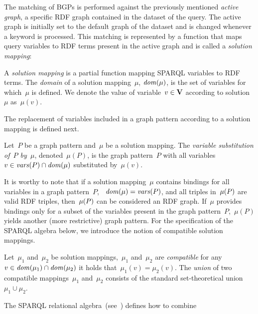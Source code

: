 The matching of \acp{BGP} is performed against the previously mentioned \emph{active graph}, a specific \ac{RDF} graph
contained in the dataset of the query.  The active graph is initially set to the default graph of the dataset and is
changed whenever a \GRAPH keyword is processed.
%
This matching is represented by a function that maps query variables to \ac{RDF} terms present in the active graph and is
called a \emph{solution mapping}:
%
\begin{definition}
  \label{def:solution-mapping}
  A \emph{solution mapping} is a partial function mapping SPARQL variables to \ac{RDF} terms.  The \emph{domain} of a
  solution mapping~$\mu$, $\mathit{dom}\!\left(\mu\right)$, is the set of variables for which~$\mu$ is defined. We denote the value of
  variable~$v\in\mathbf{V}$ according to solution~$\mu$ as~$\mu(v)$.
\end{definition}
% 
\nd The replacement of variables included in a graph pattern according to a solution mapping is defined next.
%
\begin{definition}
  \label{def:variable-substitution}
  Let~$P$ be a graph pattern and~$\mu$ be a solution mapping.  
  The \emph{variable substitution of~$P$ by~$\mu$}, denoted~$\mu(P)$, is the graph pattern~$P$ with all
  variables~$v\in\mathit{vars}\!\left(P\right)\cap \mathit{dom}\!\left(\mu\right)$ substituted by~$\mu(v)$.
\end{definition}
%
\noindent It is worthy to note that if a solution mapping~$\mu$ contains bindings for all variables in a graph
pattern~$P$, \ie~$\mathit{dom}\!\left(\mu\right) = \mathit{vars}\!\left(P\right)$, and all triples in~$\mathit{\mu}\!\left(P\right)$ are valid \ac{RDF} triples,
then~$\mathit{\mu}\!\left(P\right)$ can be considered an \ac{RDF} graph.
%
If~$\mu$ provides bindings only for a subset of the variables present in the graph pattern~$P$,~$\mu(P)$ yields another
(more restrictive) graph pattern.
%
For the specification of the SPARQL algebra below, we introduce the notion of compatible solution mappings.
%
\begin{definition}
  \label{def:compatible-mappings}
  Let~$\mu_1$ and~$\mu_2$ be solution mappings,~$\mu_1$ and~$\mu_2$ are \emph{compatible} \iff for any~$v \in
  \mathit{dom}\!\left(\mu_1\right) \cap \mathit{dom}\!\left(\mu_2\right)$ it holds that~$\mu_1(v) = \mu_2(v)$.  The \emph{union} of two compatible
  mappings~$\mu_1$ and~$\mu_2$ consists of the standard set-theoretical union~$\mu_1 \cup \mu_2$.
\end{definition}
%
\noindent The SPARQL relational
algebra~(see~\citet{Cyganiak:2005aa,PrudhommeauxSeaborne:2008aa,PerezArenasGutierrez:2009aa}) defines how to combine
